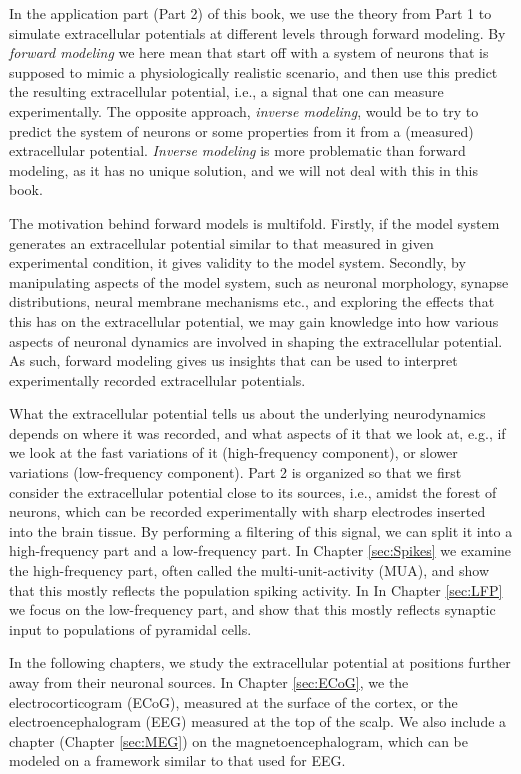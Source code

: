 {In the application part (Part 2) of this book, we use the theory from Part 1 to simulate extracellular potentials at different levels through forward modeling. By \textit{forward modeling} we here mean that start off with a system of neurons that is supposed to mimic a physiologically realistic scenario, and then use this predict the resulting extracellular potential, i.e., a signal that one can measure experimentally. The opposite approach, \textit{inverse modeling}, would be to try to predict the system of neurons or some properties from it from a (measured) extracellular potential. \textit{Inverse modeling} is more problematic than forward modeling, as it has no unique solution, and we will not deal with this in this book.

The motivation behind forward models is multifold. Firstly, if the model system generates an extracellular potential similar to that measured in given experimental condition, it gives validity to the model system. Secondly, by manipulating aspects of the model system, such as neuronal morphology, synapse distributions, neural membrane mechanisms etc., and exploring the effects that this has on the extracellular potential, we may gain knowledge into how various aspects of neuronal dynamics are involved in shaping the extracellular potential. As such, forward modeling gives us insights that can be used to interpret experimentally recorded extracellular potentials. 

What the extracellular potential tells us about the underlying neurodynamics depends on where it was recorded, and what aspects of it that we look at, e.g., if we look at the fast variations of it (high-frequency component), or slower variations (low-frequency component). Part 2 is organized so that we first consider the extracellular potential close to its sources, i.e., amidst the forest of neurons, which can be recorded experimentally with sharp electrodes inserted into the brain tissue. By performing a filtering of this signal, we can split it into a high-frequency part and a low-frequency part. In Chapter \ref{sec:Spikes} we examine the high-frequency part, often called the multi-unit-activity (MUA), and show that this mostly reflects the population spiking activity. In In Chapter \ref{sec:LFP} we focus on the low-frequency part, and show that this mostly reflects synaptic input to populations of pyramidal cells.

In the following chapters, we study the extracellular potential at positions further away from their neuronal sources. In Chapter \ref{sec:ECoG}, we the electrocorticogram (ECoG), measured at the surface of the cortex, or the electroencephalogram (EEG) measured at the top of the scalp. We also include a chapter (Chapter \ref{sec:MEG}) on the magnetoencephalogram, which can be modeled on a framework similar to that used for EEG. 

}
